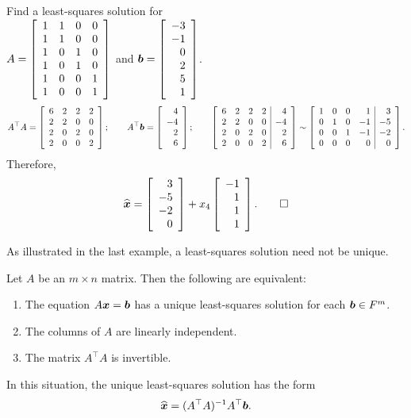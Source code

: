 \begin{Exam} Find a least-squares solution for\\
$A = \mtx{rrrr}{1&1&0&0\\1&1&0&0\\1&0&1&0\\1&0&1&0\\1&0&0&1\\1&0&0&1}$ and $\bb b = \vr{-3\\-1\\0\\2\\5\\1}$.\\

\[A^\top A = \mtx{rrrr}{6&2&2&2\\2&2&0&0\\2&0&2&0\\2&0&0&2};\qquad A^\top\bb b = \vr{4\\-4\\2\\6};\qquad \mtx{rrrr|r}{6&2&2&2&4\\2&2&0&0&-4\\2&0&2&0&2\\2&0&0&2&6} \sim \mtx{rrrr|r}{1&0&0& 1&3\\0&1&0&-1&-5\\0&0&1&-1&-2\\0&0&0&0&0}.\] Therefore, 
\[\widehat{\bb x} = \vr{3\\-5\\-2\\0} + x_4\vr{-1\\1\\1\\1}. \qedhere\]
\end{Exam}

As illustrated in the last example, a least-squares solution need not be unique.\\

\begin{Thm}\label{thm:leastsquaresolution} Let $A$ be an $m\times n$ matrix. Then the following are equivalent:
\begin{enumerate}[!THM!, start=1]
\item The equation $A\bb x = \bb b$ has a unique least-squares solution for each $\bb b \in F^m$.
\item The columns of $A$ are linearly independent.
\item The matrix $A^\top A$ is invertible.
\end{enumerate} In this situation, the unique least-squares solution has the form
\[\widehat{\bb x } = (A^\top A)^{-1}A^\top\bb b.\]
\end{Thm}

